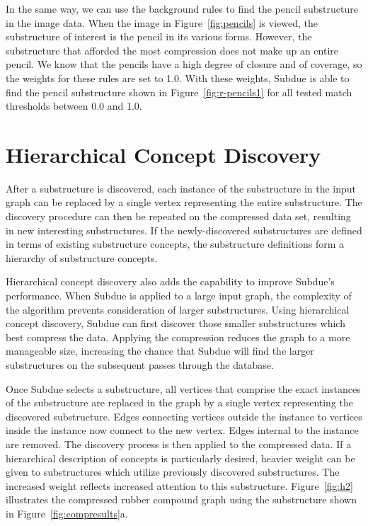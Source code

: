 
In the same way, we can use the background rules to find the pencil substructure
in the image data.  When the image in Figure~\ref{fig:pencils} is viewed, the
substructure of interest is the pencil in its various forms.  However, the
substructure that afforded the most compression does not make up an entire
pencil.  We know that the pencils have a high degree of closure and of
coverage, so the weights for these rules are set to 1.0.  With these weights,
{\sc Subdue} is able to find the pencil substructure shown
in Figure~\ref{fig:r-pencils1} for all tested match thresholds
between 0.0 and 1.0.


\section{Hierarchical Concept Discovery}
\label{s:hier}

After a substructure is discovered, each instance of the substructure in the
input graph can be replaced by a single vertex representing the entire
substructure.  The discovery procedure can then be repeated on the compressed
data set, resulting in new interesting substructures.  If the newly-discovered
substructures are defined in terms of existing substructure concepts, the
substructure definitions form a hierarchy of substructure concepts.

Hierarchical concept discovery also adds the capability
to improve {\sc Subdue}'s performance.
When {\sc Subdue} is applied to a large input graph, the complexity of the
algorithm prevents consideration of larger substructures.
Using hierarchical concept discovery, {\sc Subdue} can first discover those
smaller substructures which
best compress the data.  Applying the compression reduces the graph to a more
manageable size, increasing the chance that {\sc Subdue} will
find the larger substructures on the subsequent passes through the database.

Once {\sc Subdue}
selects a substructure, all vertices that comprise the exact instances of the
substructure are replaced in the graph by a single vertex representing the
discovered substructure.  Edges connecting vertices
outside the instance to vertices inside the instance now connect to the new
vertex.  Edges internal to the instance are removed.  The discovery process
is then applied to the compressed data.
If a hierarchical description of concepts is particularly
desired, heavier weight can be given to substructures which utilize
previously discovered substructures.  The increased weight reflects
increased attention to this substructure.
Figure~\ref{fig:h2} illustrates
the compressed rubber compound graph using the substructure shown
in Figure~\ref{fig:compresults}a.

